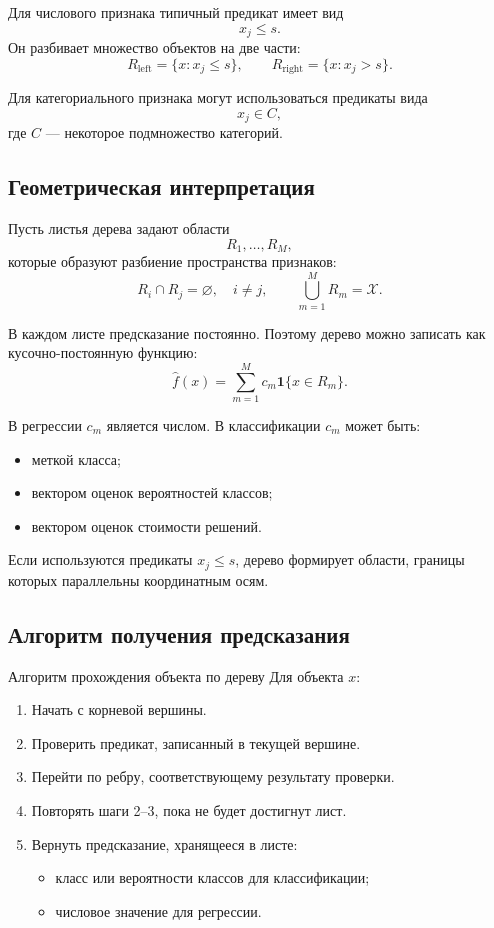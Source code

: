 \documentclass[12pt,a4paper]{article}
\theoremstyle{plain}
\theoremstyle{definition}
\theoremstyle{remark}
\newcommand{\ind}{\mathbf{1}}
\begin{document}
Для числового признака типичный предикат имеет вид
\[
    x_j\le s.
\]
Он разбивает множество объектов на две части:
\[
    R_{\mathrm{left}}
    =
    \{x:x_j\le s\},
    \qquad
    R_{\mathrm{right}}
    =
    \{x:x_j>s\}.
\]

Для категориального признака могут использоваться предикаты вида
\[
    x_j\in C,
\]
где $C$ --- некоторое подмножество категорий.

\subsection{Геометрическая интерпретация}

Пусть листья дерева задают области
\[
    R_1,\ldots,R_M,
\]
которые образуют разбиение пространства признаков:
\[
    R_i\cap R_j=\varnothing,\quad i\ne j,
    \qquad
    \bigcup_{m=1}^{M}R_m=\mathcal{X}.
\]

В каждом листе предсказание постоянно. Поэтому дерево можно записать
как кусочно-постоянную функцию:
\[
    \widehat{f}(x)
    =
    \sum_{m=1}^{M}
    c_m\ind\{x\in R_m\}.
\]

В регрессии $c_m$ является числом. В классификации $c_m$ может быть:
\begin{itemize}
    \item меткой класса;
    \item вектором оценок вероятностей классов;
    \item вектором оценок стоимости решений.
\end{itemize}

Если используются предикаты $x_j\le s$, дерево формирует области,
границы которых параллельны координатным осям.

\subsection{Алгоритм получения предсказания}

\begin{algorithmblock}{Алгоритм прохождения объекта по дереву}
Для объекта $x$:
\begin{enumerate}[label=\arabic*.]
    \item Начать с корневой вершины.
    \item Проверить предикат, записанный в текущей вершине.
    \item Перейти по ребру, соответствующему результату проверки.
    \item Повторять шаги 2--3, пока не будет достигнут лист.
    \item Вернуть предсказание, хранящееся в листе:
    \begin{itemize}
        \item класс или вероятности классов для классификации;
        \item числовое значение для регрессии.
    \end{itemize}
\end{enumerate}
\end{algorithmblock}
\end{document}

